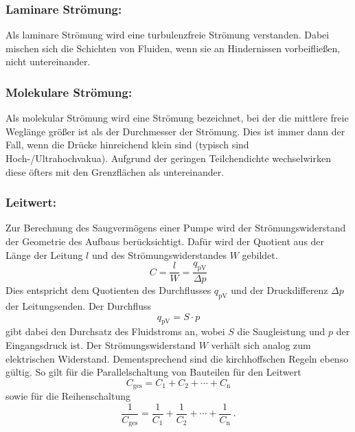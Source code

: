 \subsubsection{Laminare Strömung:}
Als laminare Strömung wird eine turbulenzfreie Strömung verstanden. Dabei mischen sich die Schichten von Fluiden, wenn sie an Hindernissen vorbeifließen, nicht untereinander.

\subsubsection{Molekulare Strömung:}
Als molekular Strömung wird eine Strömung bezeichnet, bei der die mittlere freie Weglänge größer ist als der Durchmesser der Strömung. Dies ist immer dann der Fall, wenn die Drücke hinreichend klein sind (typisch sind Hoch-/Ultrahochvakua). Aufgrund der geringen Teilchendichte wechselwirken diese öfters mit den Grenzflächen als untereinander.

\subsubsection{Leitwert:}
Zur Berechnung des Saugvermögens einer Pumpe wird der Strömungswiderstand der Geometrie des Aufbaus berücksichtigt. Dafür wird der Quotient aus der Länge der Leitung $l$ und des Strömungswiderstandes $W$ gebildet.
\begin{equation}\label{eqn:Leitwert}
  C = \frac{l}{W} = \frac{q_\text{pV}}{\Delta p}
\end{equation}
Dies entspricht dem Quotienten des Durchflusses $q_\text{pV}$ und der Druckdifferenz $\Delta p$ der Leitungsenden. Der Durchfluss
\begin{equation}
 q_\text{pV} = S \cdot p
  \label{eqn:durch}
\end{equation}
gibt dabei den Durchsatz des Fluidstroms an, wobei $S$ die Saugleistung und $p$ der Eingangsdruck ist. Der Strömungswiderstand $W$ verhält sich analog zum elektrischen Widerstand. Dementsprechend sind die kirchhoffschen Regeln ebenso gültig. So gilt für die Parallelschaltung von Bauteilen für den Leitwert
\begin{equation}
  C_\text{ges} = C_1 + C_2 + \cdots + C_\text{n}
  \label{eqn:LeitParallel}
\end{equation}
sowie für die Reihenschaltung
\begin{equation}
  \frac{1}{C_\text{ges}} = \frac{1}{C_1} + \frac{1}{C_2} + \cdots + \frac{1}{C_\text{n}} \ .
  \label{eqn:LeitReihe}
\end{equation}

